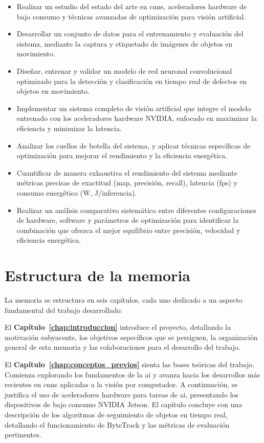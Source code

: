 \documentclass[11pt,spanish,listoffigures,listoftables]{tfgetsinf}
\begin{document}
\begin{itemize}
   \item Realizar un estudio del estado del arte en \glspl{cnn}, aceleradores hardware de bajo consumo y técnicas avanzadas de optimización para visión artificial.
   \item Desarrollar un conjunto de datos para el entrenamiento y evaluación del sistema, mediante la captura y etiquetado de imágenes de objetos en movimiento.
   \item Diseñar, entrenar y validar un modelo de red neuronal convolucional optimizado para la detección y clasificación en tiempo real de defectos en objetos en movimiento.
   \item Implementar un sistema completo de visión artificial que integre el modelo entrenado con los aceleradores hardware NVIDIA, enfocado en maximizar la eficiencia y minimizar la latencia.
   \item Analizar los cuellos de botella del sistema, y aplicar técnicas específicas de optimización para mejorar el rendimiento y la eficiencia energética.
   \item Cuantificar de manera exhaustiva el rendimiento del sistema mediante métricas precisas de exactitud (\gls{map}, precisión, recall), latencia (\gls{fps}) y consumo energético (W, J/inferencia).
   \item Realizar un análisis comparativo sistemático entre diferentes configuraciones de hardware, software y parámetros de optimización para identificar la combinación que ofrezca el mejor equilibrio entre precisión, velocidad y eficiencia energética.
\end{itemize}

\section{Estructura de la memoria}\label{sec:estructura_memoria}

La memoria se estructura en seis capítulos, cada uno dedicado a un aspecto fundamental del trabajo desarrollado:

El \textbf{Capítulo~\ref{chap:introduccion}} introduce el proyecto, detallando la motivación subyacente, los objetivos específicos que se persiguen, la organización general de esta memoria y las colaboraciones para el desarrollo del trabajo.

El \textbf{Capítulo~\ref{chap:conceptos_previos}} sienta las bases teóricas del trabajo. Comienza explorando los fundamentos de la \gls{ai} y avanza hacia los desarrollos más recientes en \glspl{cnn} aplicadas a la visión por computador. A continuación, se justifica el uso de aceleradores hardware para tareas de \gls{ai}, presentando los dispositivos de bajo consumo NVIDIA Jetson. El capítulo concluye con una descripción de los algoritmos de seguimiento de objetos en tiempo real, detallando el funcionamiento de ByteTrack y las métricas de evaluación pertinentes.
\end{document}
